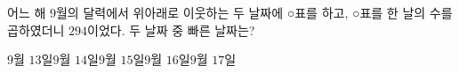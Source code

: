 어느 해 $9$월의 달력에서 위아래로 이웃하는 두 날짜에 ○표를 하고, ○표를 한 날의 수를 곱하였더니 $294$이었다. 두 날짜 중 빠른 날짜는?
\begin{choices32}{$9$월 $13$일}{$9$월 $14$일}{$9$월 $15$일}{$9$월 $16$일}{$9$월 $17$일}\end{choices32}
